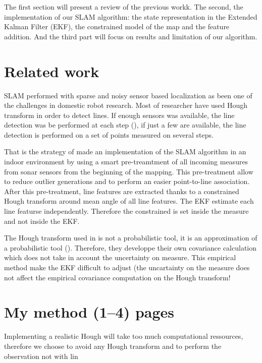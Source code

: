 \documentclass[a4paper,12pt]{article}
\begin{document}
The first section will present a review of the previous workk. The second, the implementation of our SLAM algorithm: the state representation in the Extended Kalman Filter (EKF), the constrained model of the map and the feature addition. And the third part will focus on results and limitation of our algorithm.

\section{Related work}
\label{sec:relwork}

SLAM performed with sparse and noisy sensor based localization as been one of the challenges in domestic robot research. 
Most of researcher have used Hough transform in order to detect lines. If enough sensors was available, the line detection was be performed at each step (\cite{grossmann2001robust}), if just a few are available, the line detection is performed on a set of points measured on several steps.

That is the strategy of \cite{choi2008line} made an implementation of the SLAM algorithm in an indoor environment by using a smart pre-treamtment of all incoming measures from sonar sensors from the beginning of the mapping. This pre-treatment allow to reduce outlier generations and to perform an easier point-to-line association.
After this pre-treatment, line features are extracted thanks to a constrained Hough transform around mean angle of all line features. The EKF estimate each line featurse independently.
Therefore the constrained is set inside the measure and not inside the EKF.

The Hough transform used in \cite{choi2008line} is not a probabilistic tool, it is an approximation of a probabilistic tool (\cite{stephens1991probabilistic}).
Therefore, they developpe their own covariance calculation which does not take in account the uncertainty on measure.
This empirical method make the EKF difficult to adjust (the uncartainty on the measure does not affect the empirical covariance computation on the Hough transform!



\section{My method (1--4) pages}
\label{sec:method}


Implementing a realistic Hough will take too much computational ressources, therefore we choose to avoid any Hough transform and to perform the observation not with lin
\end{document}
